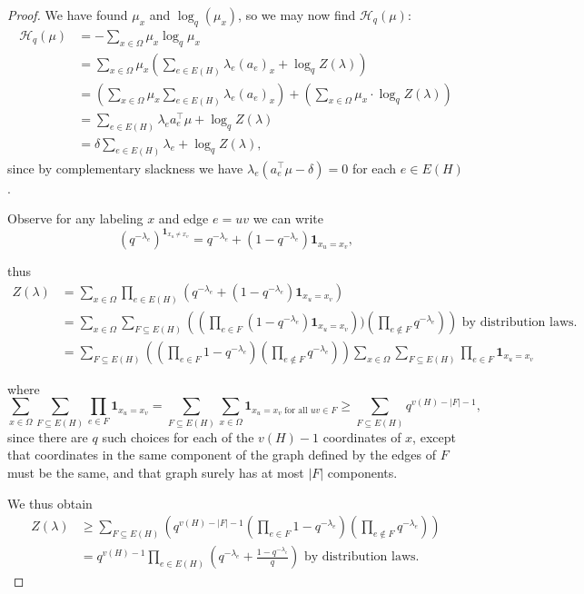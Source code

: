 \documentclass[12pt]{article}
\begin{document}
\begin{proof}
We have found $\mu_x$ and $\log_q(\mu_x)$, so we may now find $\mathcal H_{q}(\mu)$:
\begin{align*}
    \mathcal H_{q}(\mu)&=-\sum_{x\in\Omega}\mu_x\log_q\mu_x\\
    &=\sum_{x\in\Omega}\mu_x\left(\sum_{e\in E(H)}\lambda_e(a_e)_x+\log_qZ(\lambda)\right)\\
    &=\left(\sum_{x\in\Omega}\mu_x\sum_{e\in E(H)}\lambda_e(a_e)_x\right)+\left(\sum_{x\in\Omega}\mu_x\cdot\log_q Z(\lambda)\right)\\
    &=\sum_{e\in E(H)}\lambda_ea_e^\top\mu+\log_qZ(\lambda)\\
    &=\delta\sum_{e\in E(H)}\lambda_e+\log_qZ(\lambda) \tag{1},
    \end{align*}
since by complementary slackness we have $\lambda_e(a_e^\top\mu-\delta)=0$ for each $e\in E(H)$.













Observe for any labeling $x$ and edge $e=uv$ we can write 
\[
(q^{-\lambda_e})^{\mathbf1_{x_u\not=x_v}}=q^{-\lambda_e}+(1-q^{-\lambda_e})\mathbf 1_{x_u=x_v},
\]

thus
\begin{align*}
    Z(\lambda)&=\sum_{x\in\Omega}\prod_{e\in E(H)}(q^{-\lambda_e}+(1-q^{-\lambda_e})\mathbf 1_{x_u=x_v})\\
    &=\sum_{x\in\Omega}\sum_{F\subseteq E(H)}\left((\prod_{e\in F}(1-q^{-\lambda_e})\mathbf 1_{x_u=x_v}))(\prod_{e\not\in F} q^{-\lambda_e})\right)\text{ by distribution laws.}\\
    &=\sum_{F\subseteq E(H)}\left((\prod_{e\in F}1-q^{-\lambda_e})(\prod_{e\not\in F} q^{-\lambda_e})\right)\sum_{x\in\Omega}\sum_{F\subseteq E(H)}\prod_{e\in F}\mathbf 1_{x_u=x_v}
\end{align*}

where
\[
\sum_{x\in\Omega}\sum_{F\subseteq E(H)}\prod_{e\in F}\mathbf 1_{x_u=x_v}=\sum_{F\subseteq E(H)}\sum_{x\in\Omega}\mathbf 1_{x_u=x_v\text{ for all }uv\in F}\geq\sum_{F\subseteq E(H)}q^{v(H)-|F|-1},
\]
since there are $q$ such choices for each of the $v(H)-1$ coordinates of $x$, except that coordinates in the same component of the graph defined by the edges of $F$ must be the same, and that graph surely has at most $|F|$ components.

We thus obtain
\begin{align*}
    Z(\lambda)&\geq\sum_{F\subseteq E(H)}\left(q^{v(H)-|F|-1}(\prod_{e\in F}1-q^{-\lambda_e})(\prod_{e\not\in F} q^{-\lambda_e})\right)\\
    &=q^{v(H)-1}\prod_{e\in E(H)}(q^{-\lambda_e}+\frac{1-q^{-\lambda_e}}{q})\text{ by distribution laws}.
\end{align*}


\end{proof}
\end{document}
